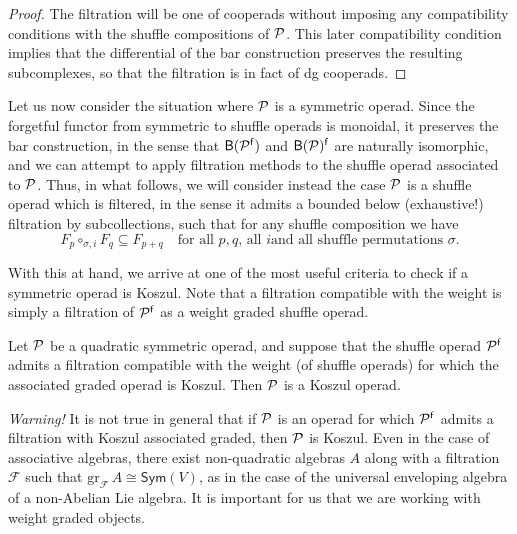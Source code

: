  \begin{proof}
 The filtration will be one of cooperads without
 imposing any compatibility conditions with the
 shuffle compositions of $\mathcal P$. This
 later compatibility condition implies that
 the differential of the bar construction
 preserves the resulting subcomplexes,
 so that the filtration is in fact of dg
 cooperads.  \end{proof}
 
  Let us now consider the situation where $\mathcal P$
 is a symmetric operad. Since the forgetful
 functor from symmetric to shuffle operads is
 monoidal, it preserves the bar construction,
 in the sense that $\mathsf{B}(\mathcal P^{\mathsf{f}})$ and
 $\mathsf{B}(\mathcal P)^{\mathsf{f}}$ are naturally isomorphic,
 and we can attempt to apply filtration methods
 to the shuffle operad associated to $\mathcal P$.
 Thus, in what follows, we will consider instead
 the case $\mathcal P$ is a shuffle operad which is
 filtered, in the sense it admits a bounded
 below (exhaustive!) filtration by subcollections,
 such that for any shuffle composition we have
 \[
 F_p \circ_{\sigma,i} F_q \subseteq
  F_{p+q}\quad\text{for all $p,q$, all $i$
  and all shuffle permutations $\sigma$.}
 \]
 
 
 With this at hand, we arrive at one of the most
 useful criteria to check if a symmetric operad
 is Koszul. Note that a filtration compatible with
 the weight is simply a filtration of $\mathcal P^{\mathsf{f}}$
 as a weight graded shuffle operad. 
 
 \begin{theorem}
 Let $\mathcal P$ be a quadratic
 symmetric operad, and suppose
 that the shuffle operad $\mathcal P^{\mathsf{f}}$ admits
 a filtration compatible with the weight
 (of shuffle operads) for which
 the associated graded operad is Koszul.
 Then $\mathcal P$ is a Koszul operad.
 \end{theorem}
 
 \emph{Warning!} It is not true in general
 that if $\mathcal P$ is an operad for which $\mathcal P^{\mathsf{f}}$
 admits a filtration with Koszul associated
 graded, then $\mathcal P$ is Koszul. Even in the case
 of associative algebras, there exist non-quadratic
 algebras $A$ along with a filtration $\mathcal F$
 such that $\mathrm{gr}_\mathcal F \, A \cong 
 \mathsf{Sym}(V)$, as in the case of the
 universal enveloping algebra of a non-Abelian
 Lie algebra. It is important for us that we
 are working with weight graded objects.
 
